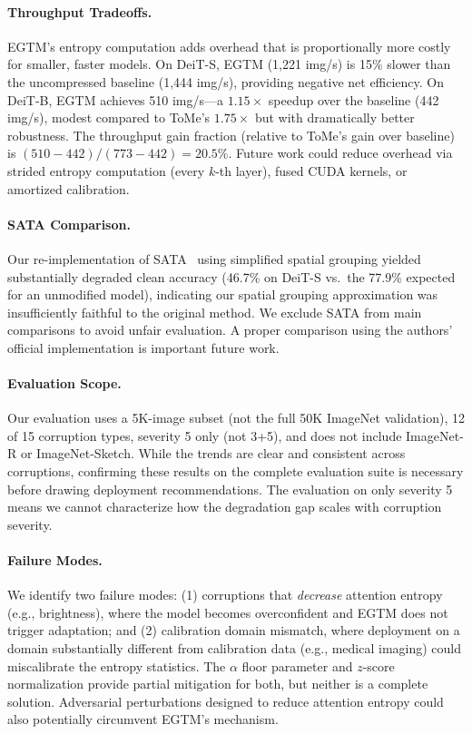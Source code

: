\documentclass{article}
\newcommand{\ours}{EGTM}
\begin{document}
\paragraph{Throughput Tradeoffs.}
\ours{}'s entropy computation adds overhead that is proportionally more costly for smaller, faster models. On DeiT-S, \ours{} (1,221 img/s) is 15\% slower than the uncompressed baseline (1,444 img/s), providing negative net efficiency. On DeiT-B, \ours{} achieves 510 img/s---a $1.15\times$ speedup over the baseline (442 img/s), modest compared to ToMe's $1.75\times$ but with dramatically better robustness. The throughput gain fraction (relative to ToMe's gain over baseline) is $(510-442)/(773-442) = 20.5\%$. Future work could reduce overhead via strided entropy computation (every $k$-th layer), fused CUDA kernels, or amortized calibration.

\paragraph{SATA Comparison.}
Our re-implementation of SATA~\citep{nikzad2025sata} using simplified spatial grouping yielded substantially degraded clean accuracy (46.7\% on DeiT-S vs.\ the 77.9\% expected for an unmodified model), indicating our spatial grouping approximation was insufficiently faithful to the original method. We exclude SATA from main comparisons to avoid unfair evaluation. A proper comparison using the authors' official implementation is important future work.

\paragraph{Evaluation Scope.}
Our evaluation uses a 5K-image subset (not the full 50K ImageNet validation), 12 of 15 corruption types, severity 5 only (not 3+5), and does not include ImageNet-R or ImageNet-Sketch. While the trends are clear and consistent across corruptions, confirming these results on the complete evaluation suite is necessary before drawing deployment recommendations. The evaluation on only severity 5 means we cannot characterize how the degradation gap scales with corruption severity.

\paragraph{Failure Modes.}
We identify two failure modes: (1) corruptions that \emph{decrease} attention entropy (e.g., brightness), where the model becomes overconfident and \ours{} does not trigger adaptation; and (2) calibration domain mismatch, where deployment on a domain substantially different from calibration data (e.g., medical imaging) could miscalibrate the entropy statistics. The $\alpha$ floor parameter and $z$-score normalization provide partial mitigation for both, but neither is a complete solution. Adversarial perturbations designed to reduce attention entropy could also potentially circumvent \ours{}'s mechanism.
\end{document}
